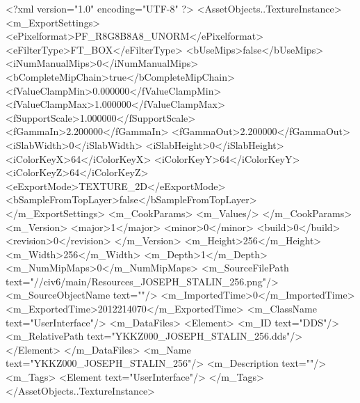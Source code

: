 <?xml version="1.0" encoding="UTF-8" ?>
<AssetObjects..TextureInstance>
	<m_ExportSettings>
		<ePixelformat>PF_R8G8B8A8_UNORM</ePixelformat>
		<eFilterType>FT_BOX</eFilterType>
		<bUseMips>false</bUseMips>
		<iNumManualMips>0</iNumManualMips>
		<bCompleteMipChain>true</bCompleteMipChain>
		<fValueClampMin>0.000000</fValueClampMin>
		<fValueClampMax>1.000000</fValueClampMax>
		<fSupportScale>1.000000</fSupportScale>
		<fGammaIn>2.200000</fGammaIn>
		<fGammaOut>2.200000</fGammaOut>
		<iSlabWidth>0</iSlabWidth>
		<iSlabHeight>0</iSlabHeight>
		<iColorKeyX>64</iColorKeyX>
		<iColorKeyY>64</iColorKeyY>
		<iColorKeyZ>64</iColorKeyZ>
		<eExportMode>TEXTURE_2D</eExportMode>
		<bSampleFromTopLayer>false</bSampleFromTopLayer>
	</m_ExportSettings>
	<m_CookParams>
		<m_Values/>
	</m_CookParams>
	<m_Version>
		<major>1</major>
		<minor>0</minor>
		<build>0</build>
		<revision>0</revision>
	</m_Version>
	<m_Height>256</m_Height>
	<m_Width>256</m_Width>
	<m_Depth>1</m_Depth>
	<m_NumMipMaps>0</m_NumMipMaps>
	<m_SourceFilePath text="//civ6/main/Resources_JOSEPH_STALIN_256.png"/>
	<m_SourceObjectName text=""/>
	<m_ImportedTime>0</m_ImportedTime>
	<m_ExportedTime>2012214070</m_ExportedTime>
	<m_ClassName text="UserInterface"/>
	<m_DataFiles>
		<Element>
			<m_ID text="DDS"/>
			<m_RelativePath text="YKKZ000_JOSEPH_STALIN_256.dds"/>
		</Element>
	</m_DataFiles>
	<m_Name text="YKKZ000_JOSEPH_STALIN_256"/>
	<m_Description text=""/>
	<m_Tags>
		<Element text="UserInterface"/>
	</m_Tags>
</AssetObjects..TextureInstance>

